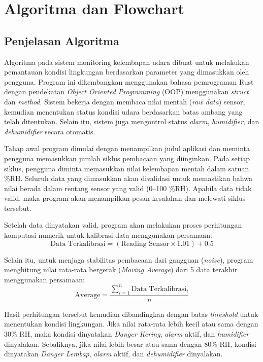 \documentclass[12pt,a4paper]{article}
\begin{document}
\section{Algoritma dan Flowchart}

\subsection{Penjelasan Algoritma}

Algoritma pada sistem monitoring kelembapan udara dibuat untuk melakukan pemantauan kondisi lingkungan berdasarkan parameter yang dimasukkan oleh pengguna. Program ini dikembangkan menggunakan bahasa pemrograman Rust dengan pendekatan \textit{Object Oriented Programming} (OOP) menggunakan \textit{struct} dan \textit{method}. Sistem bekerja dengan membaca nilai mentah (\textit{raw data}) sensor, kemudian menentukan status kondisi udara berdasarkan batas ambang yang telah ditentukan. Selain itu, sistem juga mengontrol status \textit{alarm}, \textit{humidifier}, dan \textit{dehumidifier} secara otomatis.

Tahap awal program dimulai dengan menampilkan judul aplikasi dan meminta pengguna memasukkan jumlah siklus pembacaan yang diinginkan. Pada setiap siklus, pengguna diminta memasukkan nilai kelembapan mentah dalam satuan \%RH. Seluruh data yang dimasukkan akan divalidasi untuk memastikan bahwa nilai berada dalam rentang sensor yang valid (0--100 \%RH). Apabila data tidak valid, maka program akan menampilkan pesan kesalahan dan melewati siklus tersebut.

Setelah data dinyatakan valid, program akan melakukan proses perhitungan komputasi numerik untuk kalibrasi data menggunakan persamaan:
\begin{equation}
    \text{Data Terkalibrasi} = (\text{Reading Sensor} \times 1.01) + 0.5
\end{equation}

Selain itu, untuk menjaga stabilitas pembacaan dari gangguan (\textit{noise}), program menghitung nilai rata-rata bergerak (\textit{Moving Average}) dari 5 data terakhir menggunakan persamaan:
\begin{equation}
    \text{Average} = \frac{\sum_{i=1}^{n} \text{Data Terkalibrasi}_i}{n}
\end{equation}

Hasil perhitungan tersebut kemudian dibandingkan dengan batas \textit{threshold} untuk menentukan kondisi lingkungan. Jika nilai rata-rata lebih kecil atau sama dengan 30\% RH, maka kondisi dinyatakan \textit{Danger Kering}, \textit{alarm} aktif, dan \textit{humidifier} dinyalakan. Sebaliknya, jika nilai lebih besar atau sama dengan 80\% RH, kondisi dinyatakan \textit{Danger Lembap}, \textit{alarm} aktif, dan \textit{dehumidifier} dinyalakan.
\end{document}

